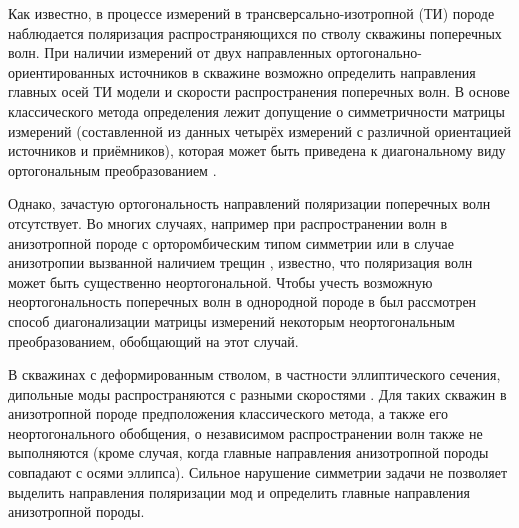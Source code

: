 \documentclass[a4paper,11pt]{article}
\begin{document}
Как известно, в процессе измерений в трансверсально-изотропной (ТИ) породе наблюдается поляризация распространяющихся по стволу скважины поперечных волн. При наличии измерений от двух направленных ортогонально-ориентированных источников в скважине возможно определить направления главных осей ТИ модели и скорости распространения поперечных волн. В основе классического метода определения лежит допущение о симметричности матрицы измерений (составленной из данных четырёх измерений с различной ориентацией источников и приёмников), которая может быть приведена к диагональному виду ортогональным преобразованием \cite{Alford1986}. 

Однако, зачастую ортогональность направлений поляризации поперечных волн отсутствует. Во многих случаях, например при распространении волн в анизотропной породе с орторомбическим типом симметрии \cite{Dellinger2001} или в случае анизотропии вызванной наличием трещин \cite{Nolte1996}, известно, что поляризация волн может быть существенно неортогональной.
Чтобы учесть возможную неортогональность поперечных волн в однородной породе в \cite{Dellinger1998} был рассмотрен способ диагонализации матрицы измерений некоторым неортогональным преобразованием, обобщающий \cite{Alford1986} на этот случай. %

В скважинах с деформированным стволом, в частности эллиптического сечения, дипольные моды распространяются с разными скоростями \cite{Seroices2010}. Для таких скважин в анизотропной породе предположения классического метода, а также его неортогонального обобщения, о независимом распространении волн также не выполняются (кроме случая, когда главные направления анизотропной породы совпадают с осями эллипса). Сильное нарушение симметрии задачи не позволяет выделить направления поляризации мод и определить главные направления анизотропной породы. 
\end{document}
